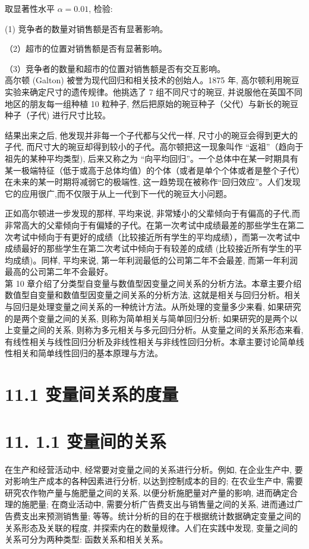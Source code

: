 \documentclass[10pt]{article}
\begin{document}
\begin{CJK*}{UTF8}{bsmi}
取显著性水平 $\alpha=0.01$, 检验:

(1) 竞争者的数量对销售额是否有显著影响。

（2）超市的位置对销售额是否有显著影响。

（3）竞争者的数量和超市的位置对销售额是否有交互影响。\\

高尔顿 (Galton) 被誉为现代回归和相关技术的创始人。1875 年, 高尔顿利用琬豆实验来确定尺寸的遗传规律。他挑选了 7 组不同尺寸的琬豆, 并说服他在英国不同地区的朋友每一组种植 10 粒种子, 然后把原始的琬豆种子（父代）与新长的琬豆种子（子代) 进行尺寸比较。

结果出来之后, 他发现并非每一个子代都与父代一样, 尺寸小的琬豆会得到更大的子代, 而尺寸大的琬豆却得到较小的子代。高尔顿把这一现象叫作 “返祖”（趋向于祖先的某种平均类型), 后来又称之为 “向平均回归”。一个总体中在某一时期具有某一极端特征（低于或高于总体均值）的个体（或者是单个个体或者是整个子代）在未来的某一时期将减弱它的极端性, 这一趋势现在被称作“回归效应”。人们发现它的应用很广,而不仅限于从上一代到下一代的琬豆大小问题。

正如高尔顿进一步发现的那样, 平均来说, 非常矮小的父辈倾向于有偏高的子代,而非常高大的父辈倾向于有偏矮的子代。在第一次考试中成绩最差的那些学生在第二次考试中倾向于有更好的成绩（比较接近所有学生的平均成绩），而第一次考试中成绩最好的那些学生在第二次考试中倾向于有较差的成绩 (比较接近所有学生的平均成绩)。同样, 平均来说, 第一年利润最低的公司第二年不会最差, 而第一年利润最高的公司第二年不会最好。\\
第 10 章介绍了分类型自变量与数值型因变量之间关系的分析方法。本章主要介绍数值型自变量和数值型因变量之间关系的分析方法, 这就是相关与回归分析。相关与回归是处理变量之间关系的一种统计方法。从所处理的变量多少来看, 如果研究的是两个变量之间的关系, 则称为简单相关与简单回归分析; 如果研究的是两个以上变量之间的关系, 则称为多元相关与多元回归分析。从变量之间的关系形态来看, 有线性相关与线性回归分析及非线性相关与非线性回归分析。本章主要讨论简单线性相关和简单线性回归的基本原理与方法。

\section*{11.1 变量间关系的度量}
\section*{11. 1.1 变量间的关系}
在生产和经营活动中, 经常要对变量之间的关系进行分析。例如, 在企业生产中, 要对影响生产成本的各种因素进行分析, 以达到控制成本的目的; 在农业生产中, 需要研究农作物产量与施肥量之间的关系, 以便分析施肥量对产量的影响, 进而确定合理的施肥量; 在商业活动中, 需要分析广告费支出与销售量之间的关系, 进而通过广告费支出来预测销售量; 等等。统计分析的目的在于根据统计数据确定变量之间的关系形态及关联的程度, 并探索内在的数量规律。人们在实践中发现, 变量之间的关系可分为两种类型: 函数关系和相关关系。


\end{CJK*}
\end{document}
